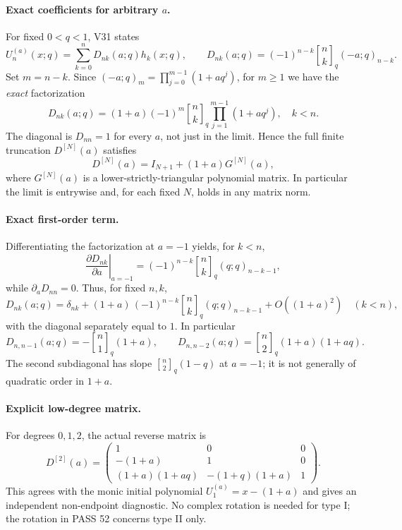 \documentclass[11pt]{article}
\begin{document}
\paragraph{Exact coefficients for arbitrary $a$.} For fixed $0<q<1$, V31 states
\begin{equation}\label{eq:v125-matrix}
 U_n^{(a)}(x;q)=\sum_{k=0}^n D_{nk}(a;q)h_k(x;q),\qquad
 \boxed{D_{nk}(a;q)=(-1)^{n-k}{n\brack k}_q(-a;q)_{n-k}.}
\end{equation}
Set $m=n-k$. Since $(-a;q)_m=\prod_{j=0}^{m-1}(1+aq^j)$, for $m\ge1$ we have the \emph{exact} factorization
\begin{equation}\label{eq:v125-factor}
 \boxed{D_{nk}(a;q)=(1+a)(-1)^m{n\brack k}_q
 \prod_{j=1}^{m-1}(1+aq^j),\quad k<n.}
\end{equation}
The diagonal is $D_{nn}=1$ for every $a$, not just in the limit. Hence the full finite truncation $D^{[N]}(a)$ satisfies
\[
 \boxed{D^{[N]}(a)=I_{N+1}+(1+a)G^{[N]}(a),}
\]
where $G^{[N]}(a)$ is a lower-strictly-triangular polynomial matrix. In particular the limit is entrywise and, for each fixed $N$, holds in any matrix norm.

\paragraph{Exact first-order term.} Differentiating the factorization at $a=-1$ yields, for $k<n$,
\begin{equation}\label{eq:v125-derivative}
 \boxed{\left.\frac{\partial D_{nk}}{\partial a}\right|_{a=-1}
 =(-1)^{n-k}{n\brack k}_q(q;q)_{n-k-1},}
\end{equation}
while $\partial_aD_{nn}=0$. Thus, for fixed $n,k$,
\[
 D_{nk}(a;q)=\delta_{nk}+(1+a)\,(-1)^{n-k}{n\brack k}_q(q;q)_{n-k-1}+O((1+a)^2)
 \quad(k<n),
\]
with the diagonal separately equal to $1$. In particular
\[
 \boxed{D_{n,n-1}(a;q)=-{n\brack1}_q(1+a),\qquad
 D_{n,n-2}(a;q)={n\brack2}_q(1+a)(1+aq).}
\]
The second subdiagonal has slope ${n\brack2}_q(1-q)$ at $a=-1$; it is not generally of quadratic order in $1+a$.

\paragraph{Explicit low-degree matrix.} For degrees $0,1,2$, the actual reverse matrix is
\begin{equation}\label{eq:v125-small}
 \boxed{D^{[2]}(a)=\begin{pmatrix}
 1&0&0\\
 -(1+a)&1&0\\
 (1+a)(1+aq)&-(1+q)(1+a)&1
 \end{pmatrix}.}
\end{equation}
This agrees with the monic initial polynomial $U_1^{(a)}=x-(1+a)$ and gives an independent non-endpoint diagnostic. No complex rotation is needed for type I; the rotation in PASS 52 concerns type II only.
\end{document}
